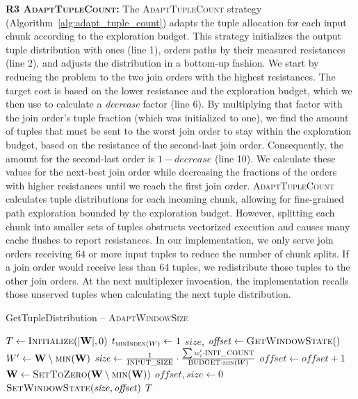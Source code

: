 \textbf{R3 \textsc{AdaptTupleCount}:} The \textsc{AdaptTupleCount} strategy (Algorithm~\ref{alg:adapt_tuple_count}) adapts the tuple allocation for each input chunk according to the exploration budget. This strategy initializes the output tuple distribution with ones (line 1), orders paths by their measured resistances (line 2), and adjusts the distribution in a bottom-up fashion. We start by reducing the problem to the two join orders with the highest resistances. The target cost is based on the lower resistance and the exploration budget, which we then use to calculate a \textit{decrease} factor (line 6). By multiplying that factor with the join order's tuple fraction (which was initialized to one), we find the amount of tuples that must be sent to the worst join order to stay within the exploration budget, based on the resistance of the second-last join order. Consequently, the amount for the second-last order is $1 - \mathit{decrease}$ (line 10). We calculate these values for the next-best join order while decreasing the fractions of the orders with higher resistances until we reach the first join order. \textsc{AdaptTupleCount} calculates tuple distributions for each incoming chunk, allowing for fine-grained path exploration bounded by the exploration budget. However, splitting each chunk into smaller sets of tuples obstructs vectorized execution and causes many cache flushes to report resistances. In our implementation, we only serve join orders receiving 64 or more input tuples to reduce the number of chunk splits. If a join order would receive less than 64 tuples, we redistribute those tuples to the other join orders. At the next multiplexer invocation, the implementation recalls those unserved tuples when calculating the next tuple distribution. 

\begin{algorithm}[!t]
\caption{GetTupleDistribution -- \textsc{AdaptWindowSize}}\label{alg:adapt_window_size}
\begin{algorithmic}[1]
\State $T \gets \textsc{Initialize}(\lvert \mathbf{W}\rvert, 0)$
\State $t_{\textsc{minIndex}(W)} \gets 1$ 
\State $\mathit{size}$, $\mathit{offset} \gets \textsc{GetWindowState}()$
 
    \State $W^{\prime} \gets \mathbf{W} \setminus \textsc{min}(\mathbf{W})$
    \State $\mathit{size} \gets \frac{1}{\textsc{INPUT\_SIZE}} \cdot \frac{\sum w^{\prime}_i \cdot \textsc{INIT\_COUNT}}{\textsc{BUDGET} \cdot \textsc{min}(W)}$
\EndIf
{}
    \State $\mathit{offset} \gets \mathit{offset} + 1$
\Else {}
    \State $\mathbf{W} \gets \textsc{SetToZero}(\mathbf{W} \setminus \textsc{min}(\mathbf{W}))$ 
    \State $\mathit{offset}, \mathit{size} \gets 0$
\EndIf
\State $\textsc{SetWindowState}(\mathit{size}, \mathit{offset})$
\State\Return $T$
\end{algorithmic}
\end{algorithm}

